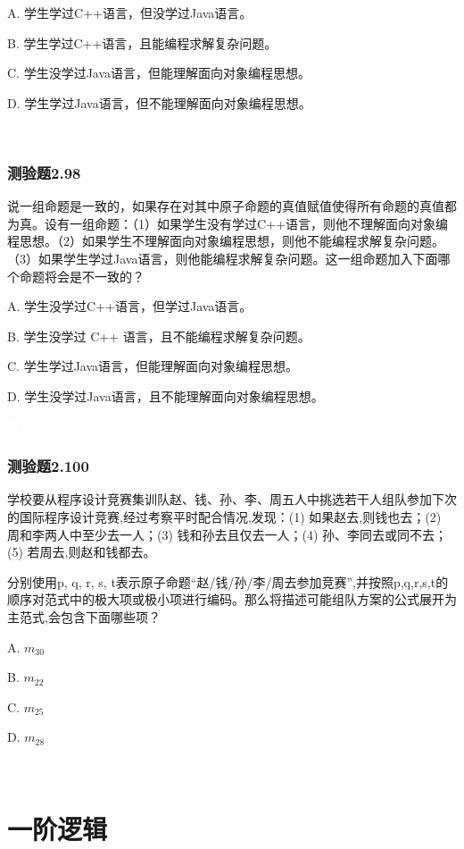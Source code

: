 \documentclass[UTF8, heading=true]{ctexart}
\begin{document}
A. 学生学过C++语言，但没学过Java语言。

B. 学生学过C++语言，且能编程求解复杂问题。

C. 学生没学过Java语言，但能理解面向对象编程思想。

D.  学生学过Java语言，但不能理解面向对象编程思想。

\textcolor{white}{答案：D}

\subsubsection{测验题2.98}

说一组命题是一致的，如果存在对其中原子命题的真值赋值使得所有命题的真值都为真。设有一组命题：（1）如果学生没有学过C++语言，则他不理解面向对象编程思想。（2）如果学生不理解面向对象编程思想，则他不能编程求解复杂问题。（3）如果学生学过Java语言，则他能编程求解复杂问题。这一组命题加入下面哪个命题将会是不一致的？

A. 学生没学过C++语言，但学过Java语言。

B. 学生没学过 C++ 语言，且不能编程求解复杂问题。

C. 学生学过Java语言，但能理解面向对象编程思想。

D.  学生没学过Java语言，且不能理解面向对象编程思想。

\textcolor{white}{答案：A}

\subsubsection{测验题2.100}

学校要从程序设计竞赛集训队赵、钱、孙、李、周五人中挑选若干人组队参加下次的国际程序设计竞赛,经过考察平时配合情况,发现：(1) 如果赵去,则钱也去；(2) 周和李两人中至少去一人；(3) 钱和孙去且仅去一人；(4) 孙、李同去或同不去；(5) 若周去,则赵和钱都去。

分别使用p, q, r, s, t表示原子命题“赵/钱/孙/李/周去参加竞赛”,并按照p,q,r,s,t的顺序对范式中的极大项或极小项进行编码。那么将描述可能组队方案的公式展开为主范式,会包含下面哪些项？

A. $ m_{30}$

B. $ m_{22}$

C. $ m_{25}$

D. $ m_{28}$

\textcolor{white}{答案：C}


\clearpage
\section{一阶逻辑}
\end{document}
